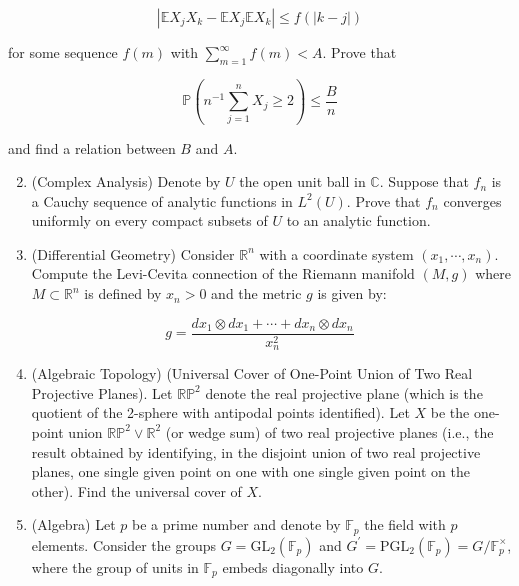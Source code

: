 \documentclass[10pt]{article}
\begin{document}
$$
\left|\mathbb{E} X_{j} X_{k}-\mathbb{E} X_{j} \mathbb{E} X_{k}\right| \leq f(|k-j|)
$$

for some sequence $f(m)$ with $\sum_{m=1}^{\infty} f(m)<A$. Prove that

$$
\mathbb{P}\left(n^{-1} \sum_{j=1}^{n} X_{j} \geq 2\right) \leq \frac{B}{n}
$$

and find a relation between $B$ and $A$.

\begin{enumerate}
  \setcounter{enumi}{1}
  \item (Complex Analysis) Denote by $U$ the open unit ball in $\mathbb{C}$. Suppose that $f_{n}$ is a Cauchy sequence of analytic functions in $L^{2}(U)$. Prove that $f_{n}$ converges uniformly on every compact subsets of $U$ to an analytic function.

  \item (Differential Geometry) Consider $\mathbb{R}^{n}$ with a coordinate system $\left(x_{1}, \cdots, x_{n}\right)$. Compute the Levi-Cevita connection of the Riemann manifold $(M, g)$ where $M \subset \mathbb{R}^{n}$ is defined by $x_{n}>0$ and the metric $g$ is given by:

\end{enumerate}

$$
g=\frac{d x_{1} \otimes d x_{1}+\cdots+d x_{n} \otimes d x_{n}}{x_{n}^{2}}
$$

\begin{enumerate}
  \setcounter{enumi}{3}
  \item (Algebraic Topology) (Universal Cover of One-Point Union of Two Real Projective Planes). Let $\mathbb{R P}^{2}$ denote the real projective plane (which is the quotient of the 2-sphere with antipodal points identified). Let $X$ be the one-point union $\mathbb{R P}^{2} \vee \mathbb{R}^{2}$ (or wedge sum) of two real projective planes (i.e., the result obtained by identifying, in the disjoint union of two real projective planes, one single given point on one with one single given point on the other). Find the universal cover of $X$.

  \item (Algebra) Let $p$ be a prime number and denote by $\mathbb{F}_{p}$ the field with $p$ elements. Consider the groups $G=\mathrm{GL}_{2}\left(\mathbb{F}_{p}\right)$ and $G^{\prime}=\mathrm{PGL}_{2}\left(\mathbb{F}_{p}\right)=G / \mathbb{F}_{p}^{\times}$, where the group of units in $\mathbb{F}_{p}$ embeds diagonally into $G$.

\end{enumerate}
\end{document}
